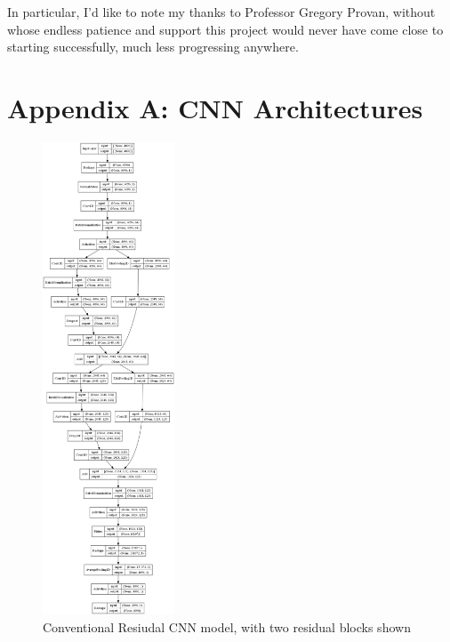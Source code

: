 \documentclass[9pt,conference]{IEEEtran}
\begin{document}
\vspace{0.5cm}

In particular, I'd like to note my thanks to Professor Gregory Provan, without whose endless patience and support this project would never have come close to starting successfully, much less progressing anywhere.

\clearpage




\section*{Appendix A: CNN Architectures}

\begin{figure}[H]
    \centering
    \includegraphics[width=0.35\textwidth]{stanfordmod.png}
    \caption{Conventional Resiudal CNN model, with two residual blocks shown}
\end{figure}
\end{document}
